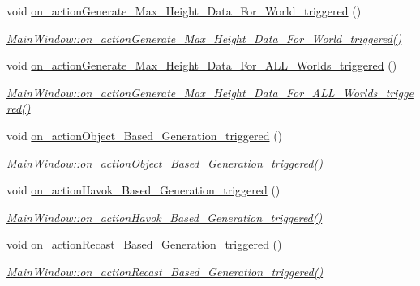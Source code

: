 \begin{DoxyCompactItemize}
void \hyperlink{class_main_window_af239e60413e6c76eb2dcf61cb088e30a}{on\+\_\+action\+Generate\+\_\+\+Max\+\_\+\+Height\+\_\+\+Data\+\_\+\+For\+\_\+\+World\+\_\+triggered} ()
\begin{DoxyCompactList}\small\item\em \hyperlink{class_main_window_af239e60413e6c76eb2dcf61cb088e30a}{Main\+Window\+::on\+\_\+action\+Generate\+\_\+\+Max\+\_\+\+Height\+\_\+\+Data\+\_\+\+For\+\_\+\+World\+\_\+triggered()} \end{DoxyCompactList}\item 
void \hyperlink{class_main_window_a9075d8b9ba0b1304260baf359961fd15}{on\+\_\+action\+Generate\+\_\+\+Max\+\_\+\+Height\+\_\+\+Data\+\_\+\+For\+\_\+\+A\+L\+L\+\_\+\+Worlds\+\_\+triggered} ()
\begin{DoxyCompactList}\small\item\em \hyperlink{class_main_window_a9075d8b9ba0b1304260baf359961fd15}{Main\+Window\+::on\+\_\+action\+Generate\+\_\+\+Max\+\_\+\+Height\+\_\+\+Data\+\_\+\+For\+\_\+\+A\+L\+L\+\_\+\+Worlds\+\_\+triggered()} \end{DoxyCompactList}\item 
void \hyperlink{class_main_window_a8a36e600870d52f9610f71b81f0cda1c}{on\+\_\+action\+Object\+\_\+\+Based\+\_\+\+Generation\+\_\+triggered} ()
\begin{DoxyCompactList}\small\item\em \hyperlink{class_main_window_a8a36e600870d52f9610f71b81f0cda1c}{Main\+Window\+::on\+\_\+action\+Object\+\_\+\+Based\+\_\+\+Generation\+\_\+triggered()} \end{DoxyCompactList}\item 
void \hyperlink{class_main_window_acce573c1ebbc822a6008c05377a4f431}{on\+\_\+action\+Havok\+\_\+\+Based\+\_\+\+Generation\+\_\+triggered} ()
\begin{DoxyCompactList}\small\item\em \hyperlink{class_main_window_acce573c1ebbc822a6008c05377a4f431}{Main\+Window\+::on\+\_\+action\+Havok\+\_\+\+Based\+\_\+\+Generation\+\_\+triggered()} \end{DoxyCompactList}\item 
void \hyperlink{class_main_window_ab934ee7c4d674c16347171a4651765f9}{on\+\_\+action\+Recast\+\_\+\+Based\+\_\+\+Generation\+\_\+triggered} ()
\begin{DoxyCompactList}\small\item\em \hyperlink{class_main_window_ab934ee7c4d674c16347171a4651765f9}{Main\+Window\+::on\+\_\+action\+Recast\+\_\+\+Based\+\_\+\+Generation\+\_\+triggered()} \end{DoxyCompactList}\item 

\end{DoxyCompactItemize}
